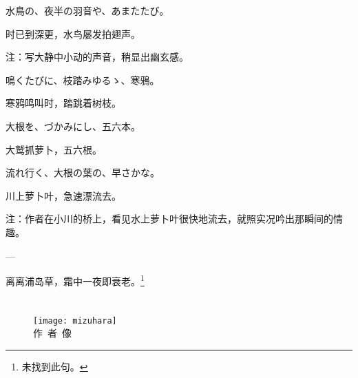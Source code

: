 \begin{haiku}
    {\FH 水鳥の、夜半の羽音や、あまたたび。}

    {\FK 时已到深更，水鸟屡发拍翅声。}

    {\FT 注：写大静中小动的声音，稍显出幽玄感。}
\end{haiku}

\begin{haiku}
    {\FH 鳴くたびに、枝踏みゆるゝ、寒鴉。}

    {\FK 寒鸦鸣叫时，踏跳着树枝。}
\end{haiku}

\begin{haiku}
    {\FH 大根を、づかみにし、五六本。}

    {\FK 大鹫抓萝卜，五六根。}
\end{haiku}

\begin{haiku}
    {\FH 流れ行く、大根の葉の、早さかな。}

    {\FK 川上萝卜叶，急速漂流去。}

    {\FT 注：作者在小川的桥上，看见水上萝卜叶很快地流去，就照实况吟出那瞬间的情趣。}
\end{haiku}

\begin{haiku}
    {\FH ---}

    {\FK 离离浦岛草，霜中一夜即衰老。\footnote{\FT 未找到此句。}}
\end{haiku}

\chapter[{\FM 水原秋櫻子}]{\FM {}}

\begin{center}
    \begin{figure}
        \centering
        \texttt{[image: mizuhara]}\\[1em]
        \large{\FS 作~者~像}
    \end{figure}
\end{center}

\newpage

